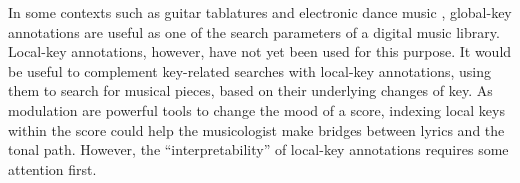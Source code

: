 
In some contexts such as guitar tablatures
\parencite{ultimateguitar} and electronic dance music
\parencite{beatport}, global-key annotations are useful as one of
the search parameters of a digital music library. Local-key
annotations, however, have not yet been used for this
purpose. It would be useful to complement key-related
searches with local-key annotations, using them to search
for musical pieces, based on their underlying changes of
key. As modulation are powerful tools to change the mood of
a score, indexing local keys within the score could help the
musicologist make bridges between lyrics and the tonal path.
However, the ``interpretability'' of local-key annotations
requires some attention first.
